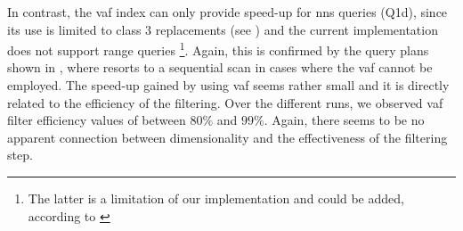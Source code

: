 In contrast, the \acrshort{vaf} index can only provide speed-up for \acrshort{nns} queries (Q1d), since its use is limited to class 3 replacements (see ) and the current implementation does not support range queries \footnote{The latter is a limitation of our implementation and could be added, according to \cite{Weber:1998Va}}. Again, this is confirmed by the query plans shown in , where \cottontail{} resorts to a sequential scan in cases where the \acrshort{vaf} cannot be employed. The speed-up gained by using \acrshort{vaf} seems rather small and it is directly related to the efficiency of the filtering. Over the different runs, we observed \acrshort{vaf} filter efficiency values of between $80\%$ and $99\%$. Again, there seems to be no apparent connection between dimensionality and the effectiveness of the filtering step.

